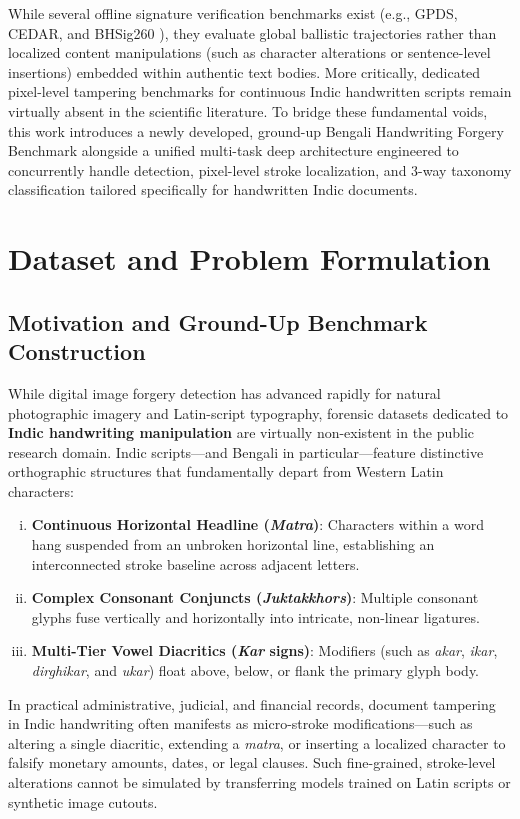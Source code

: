 \documentclass[pdflatex,sn-mathphys-num,iicol]{sn-jnl}
\begin{document}
While several offline signature verification benchmarks exist (e.g., GPDS, CEDAR, and BHSig260 \cite{bib13}), they evaluate global ballistic trajectories rather than localized content manipulations (such as character alterations or sentence-level insertions) embedded within authentic text bodies. More critically, dedicated pixel-level tampering benchmarks for continuous Indic handwritten scripts remain virtually absent in the scientific literature. To bridge these fundamental voids, this work introduces a newly developed, ground-up Bengali Handwriting Forgery Benchmark alongside a unified multi-task deep architecture engineered to concurrently handle detection, pixel-level stroke localization, and 3-way taxonomy classification tailored specifically for handwritten Indic documents.

\section{Dataset and Problem Formulation}\label{sec3}

\subsection{Motivation and Ground-Up Benchmark Construction}\label{subsec3_1}
While digital image forgery detection has advanced rapidly for natural photographic imagery and Latin-script typography, forensic datasets dedicated to \textbf{Indic handwriting manipulation} are virtually non-existent in the public research domain. Indic scripts---and Bengali in particular---feature distinctive orthographic structures that fundamentally depart from Western Latin characters:
\begin{enumerate}[(i)]
    \item \textbf{Continuous Horizontal Headline (\textit{Matra})}: Characters within a word hang suspended from an unbroken horizontal line, establishing an interconnected stroke baseline across adjacent letters.
    \item \textbf{Complex Consonant Conjuncts (\textit{Juktakkhors})}: Multiple consonant glyphs fuse vertically and horizontally into intricate, non-linear ligatures.
    \item \textbf{Multi-Tier Vowel Diacritics (\textit{Kar} signs)}: Modifiers (such as \textit{akar}, \textit{ikar}, \textit{dirghikar}, and \textit{ukar}) float above, below, or flank the primary glyph body.
\end{enumerate}
In practical administrative, judicial, and financial records, document tampering in Indic handwriting often manifests as micro-stroke modifications---such as altering a single diacritic, extending a \textit{matra}, or inserting a localized character to falsify monetary amounts, dates, or legal clauses. Such fine-grained, stroke-level alterations cannot be simulated by transferring models trained on Latin scripts or synthetic image cutouts.
\end{document}

